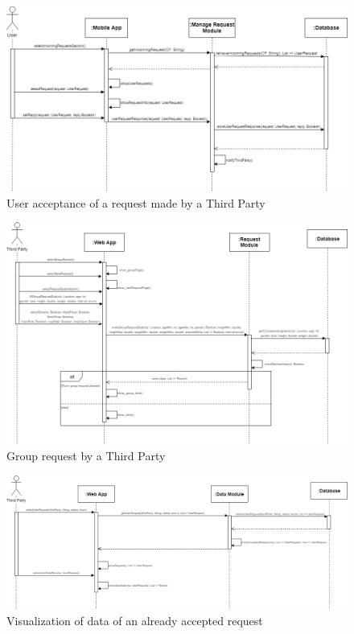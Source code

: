 \begin{figure}[H]
    \centering
    \includegraphics[scale=0.35]{DD/Pictures/acceptRequest.png}
    \caption{User acceptance of a request made by a Third Party}
\end{figure}

\begin{figure}[H]
    \centering
    \includegraphics[scale=0.35]{DD/Pictures/groupRequestSeqDiagDD.png}
    \caption{Group request by a Third Party}
\end{figure}

\begin{figure}[H]
    \centering
    \includegraphics[scale=0.35]{DD/Pictures/showDataResult.png}
    \caption{Visualization of data of an already accepted request}
\end{figure}

